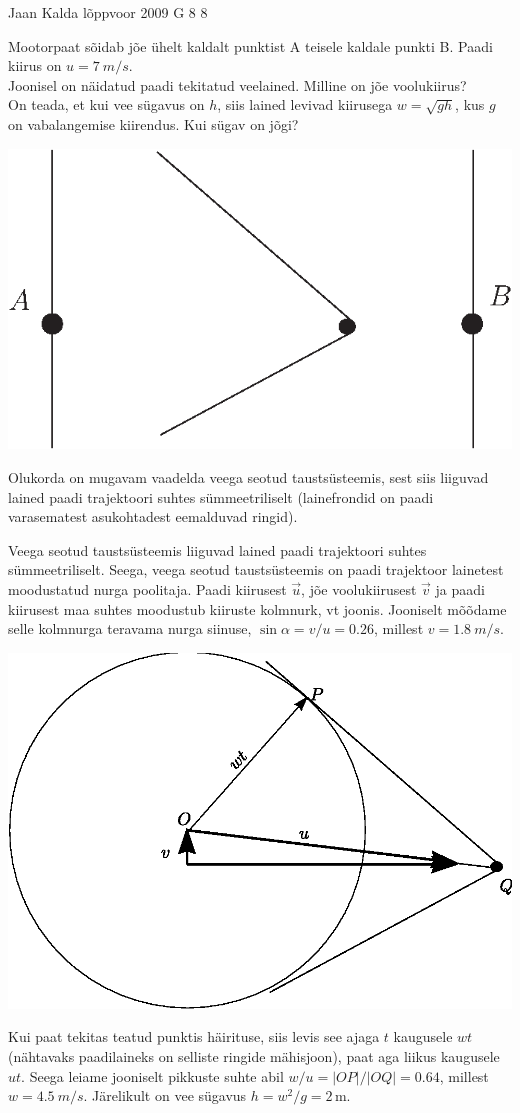 {Jaan Kalda} %
{lõppvoor} %
{2009} %
{G 8} %
{8} %
{
\ifStatement
Mootorpaat sõidab jõe ühelt kaldalt punktist A teisele kaldale punkti B. Paadi kiirus on $u=\SI{7}{m/s}$.\\
\osa Joonisel on näidatud paadi tekitatud veelained. Milline on jõe voolukiirus?\\
\osa On teada, et kui vee sügavus on $h$, siis lained levivad kiirusega $w=\sqrt{gh}$, kus $g$ on vabalangemise kiirendus.
Kui sügav on jõgi?

\begin{center}
\includegraphics[width=0.55\linewidth]{2009-v3g-08-paat.eps}
\end{center}
\fi


\ifHint
Olukorda on mugavam vaadelda veega seotud taustsüsteemis, sest siis liiguvad lained paadi trajektoori suhtes sümmeetriliselt (lainefrondid on paadi varasematest asukohtadest eemalduvad ringid).
\fi


\ifSolution
\osa
Veega seotud taustsüsteemis liiguvad lained paadi trajektoori suhtes sümmeetriliselt. Seega, veega seotud taustsüsteemis on
paadi trajektoor lainetest moodustatud nurga poolitaja. Paadi kiirusest $\vec u$, jõe voolukiirusest $\vec v$ ja paadi kiirusest maa suhtes moodustub kiiruste kolmnurk, vt joonis.
Jooniselt mõõdame selle kolmnurga teravama nurga siinuse, $\sin \alpha =v/u=\num{0.26}$, millest $v=\SI{1.8}{m/s}$.

\begin{center}
	\includegraphics[width=0.8\linewidth]{2009-v3g-08-paatlah.eps}
\end{center}

\osa
Kui paat tekitas teatud punktis häirituse, siis levis see ajaga $t$ kaugusele $wt$ (nähtavaks paadilaineks on selliste ringide mähisjoon),
paat aga liikus kaugusele $ut$. Seega leiame jooniselt pikkuste suhte abil $w/u=|OP|/|OQ|=\num{0.64}$, millest $w=\SI{4.5}{m/s}$. Järelikult on vee sügavus
$h=w^2/g=2\,$m.
\fi
}